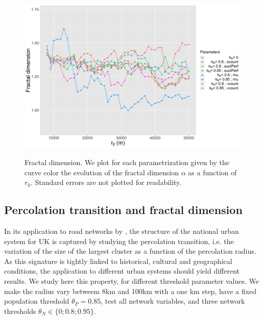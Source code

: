 \documentclass{jimis-en}
\begin{document}
\begin{figure}[ht] 
  {\includegraphics[width=\linewidth]{figures/fractaldimension.png}}
  \centering
  \caption{Fractal dimension. We plot for each parametrization given by the curve color the evolution of the fractal dimension $\alpha$ as a function of $r_0$. Standard errors are not plotted for readability.\label{fig:fractaldim}}
\end{figure}

\subsection{Percolation transition and fractal dimension}



In its application to road networks by \cite{arcaute2016cities}, the structure of the national urban system for UK is captured by studying the percolation transition, i.e. the variation of the size of the largest cluster as a function of the percolation radius. As this signature is tightly linked to historical, cultural and geographical conditions, the application to different urban systems should yield different results. We study here this property, for different threshold parameter values. We make the radius vary betweem 8km and 100km with a one km step, have a fixed population threshold $\theta_P = 0.85$, test all network variables, and three network thresholds $\theta_N \in \{ 0 ; 0.8 ; 0.95 \}$.
\end{document}
